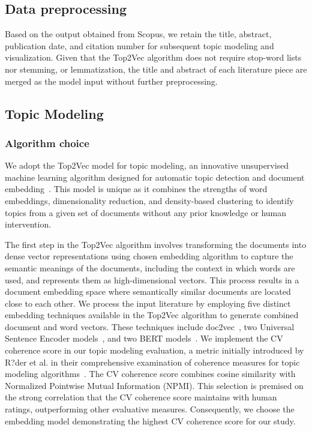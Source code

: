 \subsection{Data preprocessing}\label{subse:2-2.2}
Based on the output obtained from Scopus, we retain the title, abstract, publication date, and citation number for subsequent topic modeling and visualization. Given that the Top2Vec algorithm does not require stop-word lists nor stemming, or lemmatization, the title and abstract of each literature piece are merged as the model input without further preprocessing.
\subsection{Topic Modeling }\label{subse:2-2.3}

\subsubsection{Algorithm choice}\label{subsubse:2-2.3.1}

We adopt the Top2Vec model for topic modeling, an innovative unsupervised machine learning algorithm designed for automatic topic detection and document embedding~\cite{angelov2020top2vec}. This model is unique as it combines the strengths of word embeddings, dimensionality reduction, and density-based clustering to identify topics from a given set of documents without any prior knowledge or human intervention.

The first step in the Top2Vec algorithm involves transforming the documents into dense vector representations using chosen embedding algorithm to capture the semantic meanings of the documents, including the context in which words are used, and represents them as high-dimensional vectors. This process results in a document embedding space where semantically similar documents are located close to each other. We process the input literature by employing five distinct embedding techniques available in the Top2Vec algorithm to generate combined document and word vectors. These techniques include doc2vec~\cite{le2014distributed}, two Universal Sentence Encoder models~\cite{cer2018universal,yang2019multilingual}, and two BERT models~\cite{reimers2019sentence,reimers2020making}. We implement the CV coherence score in our topic modeling evaluation, a metric initially introduced by R?der et al. in their comprehensive examination of coherence measures for topic modeling algorithms~\cite{roder2015exploring}. The CV coherence score combines cosine similarity with Normalized Pointwise Mutual Information (NPMI). This selection is premised on the strong correlation that the CV coherence score maintains with human ratings, outperforming other evaluative measures. Consequently, we choose the embedding model demonstrating the highest CV coherence score for our study. 

